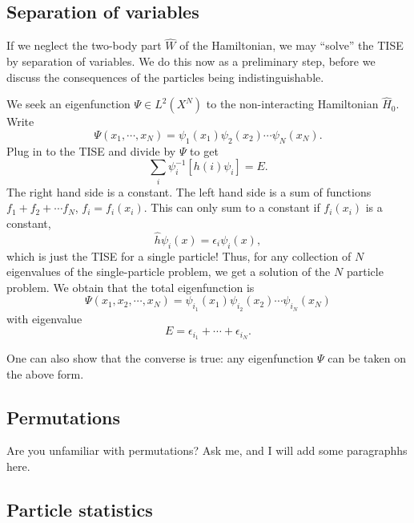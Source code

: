 \documentclass{report}
\theoremstyle{plain}
\theoremstyle{definition}
\begin{document}
\subsection{Separation of variables}

If we neglect the two-body part $\hat{W}$ of the Hamiltonian, we may
``solve'' the TISE by separation of variables. We do this now as a
preliminary step, before we discuss the consequences of the particles
being indistinguishable.

We seek an eigenfunction $\Psi \in L^2(X^N)$ to the non-interacting Hamiltonian $\hat{H}_0$.
Write
\begin{equation}
  \Psi(x_1,\cdots,x_N) = \psi_1(x_1)\psi_2(x_2) \cdots \psi_N(x_N).
\end{equation}
Plug in to the TISE and divide by $\Psi$ to get
\begin{equation}
  \sum_i \psi_i^{-1}[h(i)\psi_i] = E.
\end{equation}
The right hand side is a constant. The left hand side is a sum of
functions $f_1 + f_2  + \cdots f_N$, $f_i = f_i(x_i)$. This can only
sum to a constant if $f_i(x_i)$ is a constant,
\begin{equation}
  \hat{h}\psi_i(x) = \epsilon_i \psi_i(x),
\end{equation}
which is just the TISE for a single particle! Thus, for any collection
of $N$ eigenvalues of the single-particle problem, we get a solution
of the $N$ particle problem.
We obtain that the total eigenfunction is
\begin{equation}
  \Psi(x_1,x_2,\cdots,x_N) = \psi_{i_1}(x_1)\psi_{i_2}(x_2)\cdots\psi_{i_N}(x_N)
\end{equation}
with eigenvalue
\begin{equation}
  E = \epsilon_{i_1} + \cdots + \epsilon_{i_N}.
\end{equation}

One can also show that the converse is true: any eigenfunction $\Psi$
can be taken on the above form.


\subsection{Permutations}

Are you unfamiliar with permutations? Ask me, and I will add some
paragraphhs here.

\subsection{Particle statistics}
\end{document}
